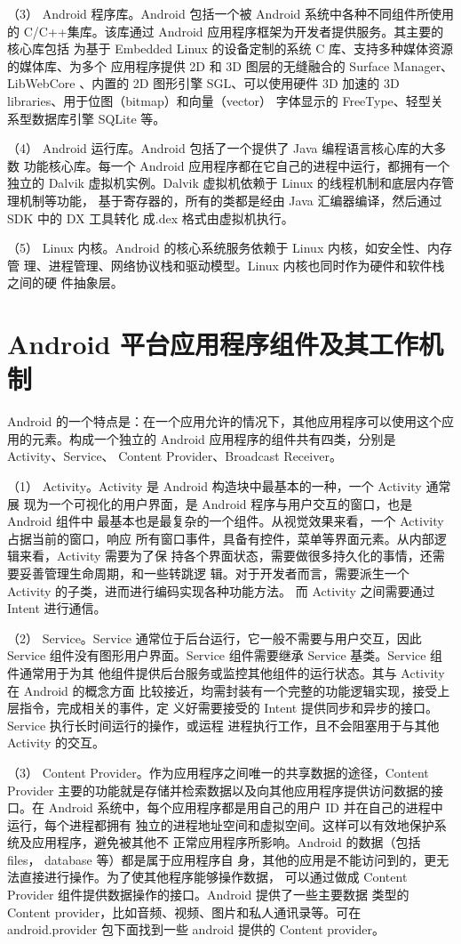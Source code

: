 （3） Android 程序库。Android 包括一个被 Android 系统中各种不同组件所使用的
C/C++集库。该库通过 Android 应用程序框架为开发者提供服务。其主要的核心库包括
为基于 Embedded Linux 的设备定制的系统 C 库、支持多种媒体资源的媒体库、为多个
应用程序提供 2D 和 3D 图层的无缝融合的 Surface Manager、LibWebCore 、内置的 2D
图形引擎 SGL、可以使用硬件 3D 加速的 3D libraries、用于位图（bitmap）和向量（vector）
字体显示的 FreeType、轻型关系型数据库引擎 SQLite 等。

（4） Android 运行库。Android 包括了一个提供了 Java 编程语言核心库的大多数
功能核心库。每一个 Android 应用程序都在它自己的进程中运行，都拥有一个独立的
Dalvik 虚拟机实例。Dalvik 虚拟机依赖于 Linux 的线程机制和底层内存管理机制等功能，
基于寄存器的，所有的类都是经由 Java 汇编器编译，然后通过 SDK 中的 DX 工具转化
成.dex 格式由虚拟机执行。

（5） Linux 内核。Android 的核心系统服务依赖于 Linux 内核，如安全性、内存管
理、进程管理、网络协议栈和驱动模型。Linux 内核也同时作为硬件和软件栈之间的硬
件抽象层。

\section{Android 平台应用程序组件及其工作机制}
Android 的一个特点是：在一个应用允许的情况下，其他应用程序可以使用这个应
用的元素。构成一个独立的 Android 应用程序的组件共有四类，分别是 Activity、Service、
Content Provider、Broadcast Receiver\cite{6}。

（1） Activity。Activity 是 Android 构造块中最基本的一种，一个 Activity 通常展
现为一个可视化的用户界面，是 Android 程序与用户交互的窗口，也是 Android 组件中
最基本也是最复杂的一个组件。从视觉效果来看，一个 Activity 占据当前的窗口，响应
所有窗口事件，具备有控件，菜单等界面元素。从内部逻辑来看，Activity 需要为了保
持各个界面状态，需要做很多持久化的事情，还需要妥善管理生命周期，和一些转跳逻
辑。对于开发者而言，需要派生一个 Activity 的子类，进而进行编码实现各种功能方法。
而 Activity 之间需要通过 Intent 进行通信。

（2） Service。Service 通常位于后台运行，它一般不需要与用户交互，因此 Service
组件没有图形用户界面。Service 组件需要继承 Service 基类。Service 组件通常用于为其
他组件提供后台服务或监控其他组件的运行状态。其与 Activity 在 Android 的概念方面
比较接近，均需封装有一个完整的功能逻辑实现，接受上层指令，完成相关的事件，定
义好需要接受的 Intent 提供同步和异步的接口。Service 执行长时间运行的操作，或运程
进程执行工作，且不会阻塞用于与其他 Activity 的交互。

（3） Content Provider。作为应用程序之间唯一的共享数据的途径，Content Provider
主要的功能就是存储并检索数据以及向其他应用程序提供访问数据的接口。在 Android
系统中，每个应用程序都是用自己的用户 ID 并在自己的进程中运行，每个进程都拥有
独立的进程地址空间和虚拟空间。这样可以有效地保护系统及应用程序，避免被其他不
正常应用程序所影响。Android 的数据（包括 files， database 等）都是属于应用程序自
身，其他的应用是不能访问到的，更无法直接进行操作。为了使其他程序能够操作数据，
可以通过做成 Content Provider 组件提供数据操作的接口。Android 提供了一些主要数据
类型的 Content provider，比如音频、视频、图片和私人通讯录等。可在 android.provider
包下面找到一些 android 提供的 Content provider。


